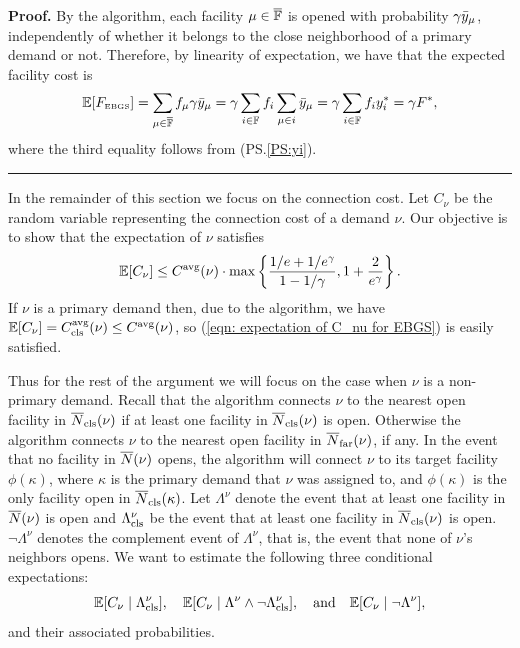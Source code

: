\documentclass[oneside,final]{ucr}
\newenvironment{proof}[1][Proof]{\textbf{#1.} }{\ \rule{0.5em}{0.5em}}
\begin{document}
\begin{proof}
By the algorithm, each facility $\mu\in \overline{\mathbb{F}}$ is opened with
probability $\gamma {\bar y}_{\mu}$, independently of whether it belongs to the
close neighborhood of a primary demand or not. Therefore, by
  linearity of expectation, we have that the expected facility cost is
%
\begin{equation*}
	\mathbb{E}[F_{\mbox{\tiny\rm EBGS}}] = \sum_{\mu \in \overline{\mathbb{F}}} f_\mu \gamma {\bar y}_{\mu} 
			= \gamma \sum_{i\in \mathbb{F}} f_i \sum_{\mu\in i} {\bar y}_{\mu} 
			= \gamma \sum_{i \in \mathbb{F}} f_i y_i^\ast = \gamma F^\ast,
\end{equation*}
%
where the third equality follows from (PS.\ref{PS:yi}).
\end{proof}


\medskip

In the remainder of this section we focus on the connection cost. Let $C_{\nu}$ be the
random variable representing the connection cost of a demand $\nu$. Our objective is
to show that the expectation of $\nu$ satisfies
%
\begin{equation}
\mathbb{E}[C_\nu]	\leq C^{{\mbox{\scriptsize\rm avg}}}(\nu) \cdot \max\left\{\frac{1/e+1/e^\gamma}{1-1/\gamma}, 1 + \frac{2}{e^\gamma}\right\}.
		\label{eqn: expectation of C_nu for EBGS}
\end{equation}
%
If $\nu$ is a primary demand then, due to the algorithm, we have $\mathbb{E}[C_{\nu}] =
C_{{\mbox{\scriptsize\rm cls}}}^{{\mbox{\scriptsize\rm avg}}}(\nu) \le C^{{\mbox{\scriptsize\rm avg}}}(\nu)$, so (\ref{eqn: expectation of C_nu for EBGS}) is
easily satisfied.

Thus for the rest of the argument we will focus on the case when $\nu$
is a non-primary demand.  Recall that the
algorithm connects $\nu$ to the nearest open facility in
${\overline{N}}_{{\mbox{\scriptsize\rm cls}}}(\nu)$ if at least one facility in ${\overline{N}}_{{\mbox{\scriptsize\rm cls}}}(\nu)$ is
open. Otherwise the algorithm connects $\nu$ to the nearest open
facility in ${\overline{N}}_{{\mbox{\scriptsize\rm far}}}(\nu)$, if any. In the event that no facility in
${\overline{N}}(\nu)$ opens, the algorithm will connect $\nu$ to its target
facility $\phi(\kappa)$, where $\kappa$ is the primary demand that
$\nu$ was assigned to, and $\phi(\kappa)$ is the only facility open in
${\overline{N}}_{{\mbox{\scriptsize\rm cls}}}(\kappa)$. Let $\Lambda^\nu$ denote the event that at least
one facility in ${\overline{N}}(\nu)$ is open and $\Lambda^\nu_{{\mbox{\scriptsize\rm cls}}}$ be the
event that at least one facility in ${\overline{N}}_{{\mbox{\scriptsize\rm cls}}}(\nu)$ is open.
$\neg \Lambda^\nu$ denotes the complement event of $\Lambda^\nu$, that is,
the event that none of $\nu$'s neighbors opens. 
We want to estimate the following three conditional expectations: 
%
\begin{equation*}
  \mathbb{E}[C_{\nu} \mid
  \Lambda^\nu_{{\mbox{\scriptsize\rm cls}}}],\quad \mathbb{E}[C_{\nu} \mid \Lambda^\nu \wedge \neg
  \Lambda^\nu_{{\mbox{\scriptsize\rm cls}}}], \quad\text{and}\quad \mathbb{E}[C_{\nu} \mid \neg \Lambda^\nu], 
\end{equation*}
%
and their associated probabilities.
\end{document}
